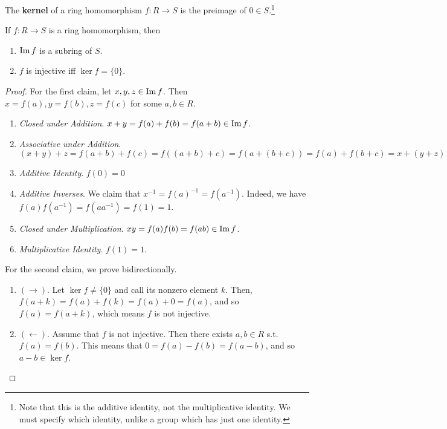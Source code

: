   \begin{definition}[Kernel]
    The \textbf{kernel} of a ring homomorphism $f: R \rightarrow S$ is the preimage of $0 \in S$.\footnote{Note that this is the additive identity, not the multiplicative identity. We must specify which identity, unlike a group which has just one identity.}
  \end{definition}

  \begin{lemma}
    If $f: R \rightarrow S$ is a ring homomorphism, then 
    \begin{enumerate}
      \item $\operatorname{Im}{f}$ is a subring of $S$. 
      \item $f$ is injective iff $\ker{f} = \{0\}$. 
    \end{enumerate}
  \end{lemma}
  \begin{proof}
    For the first claim, let $x, y, z \in \operatorname{Im}{f}$. Then $x = f(a), y = f(b), z = f(c)$ for some $a, b \in R$. 
    \begin{enumerate}
      \item \textit{Closed under Addition}. $x + y = f(a) + f(b) = f(a + b) \in \operatorname{Im}{f}$. 
      \item \textit{Associative under Addition}. $(x + y) + z = f(a + b) + f(c) = f((a + b) + c) = f(a + (b + c)) = f(a) + f(b + c) = x + (y + z)$
      \item \textit{Additive Identity}. $f(0) = 0$
      \item \textit{Additive Inverses}. We claim that $x^{-1} = f(a)^{-1} = f(a^{-1})$. Indeed, we have $f(a) f(a^{-1}) = f(a a^{-1}) = f(1) = 1$. 
      \item \textit{Closed under Multiplication}. $xy = f(a) f(b) = f(ab) \in \operatorname{Im}{f}$. 
      \item \textit{Multiplicative Identity}. $f(1) = 1$. 
    \end{enumerate}
    For the second claim, we prove bidirectionally. 
    \begin{enumerate}
      \item $(\rightarrow)$. Let $\ker{f} \neq \{0\}$ and call its nonzero element $k$. Then, $f(a + k) = f(a) + f(k) = f(a) + 0 = f(a)$, and so $f(a) = f(a + k)$, which means $f$ is not injective. 
      \item $(\leftarrow)$. Assume that $f$ is not injective. Then there exists $a, b \in R$ s.t. $f(a) = f(b)$. This means that $0 = f(a) - f(b) = f(a - b)$, and so $a - b \in \ker{f}$. 
    \end{enumerate}
  \end{proof}

